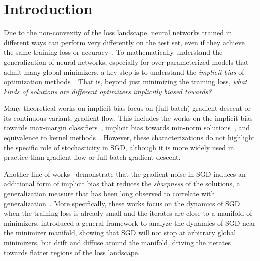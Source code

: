 \section{Introduction}

Due to the non-convexity of the loss landscape, neural networks trained in different ways can perform very differently on the test set, even if they achieve the same training loss or accuracy~\citep{zhang2017understanding,keskar2017on,liu2022pretraininglossbetterdownstream,saunshi2024inductive}.
To mathematically understand the generalization of neural networks, especially for over-parameterized models that admit many global minimizers, a key step is to understand the {\it implicit bias} of optimization methods~\citep{neyshabur2014search, soudry2018implicit}.
That is, beyond just minimizing the training loss, {\it what kinds of solutions are different optimizers implicitly biased towards?}

Many theoretical works on implicit bias focus on (full-batch) gradient descent or its continuous variant, gradient flow. This includes the works on the implicit bias towards max-margin classifiers~\citep{soudry2018implicit,nacson2019lexicographic,lyu2020gradient,ji2020directional}, implicit bias towards min-norm solutions~\citep{lyu2024dichotomy}, and equivalence to kernel methods~\citep{jacot2018neural,chizat2019lazy}.
However, these characterizations do not highlight the specific role of stochasticity in SGD, although it is more widely used in practice than gradient flow or full-batch gradient descent. 


Another line of works~\citep{blanc2020implicit,damian2021label,li2021happens} demonstrate that the gradient noise in SGD induces an additional form of implicit bias that reduces the {\it sharpness} of the solutions, a generalization measure that has been long observed to correlate with generalization~\citep{hochreiter1997flat,keskar2017on,jiang2020fantastic,foret2021sharpnessaware}.
More specifically, these works focus on the dynamics of SGD when the training loss is already small and the iterates are close to a manifold of minimizers. \citet{li2021happens} introduced a general framework to analyze the dynamics of SGD near the minimizer manifold, showing that SGD will not stop at arbitrary global minimizers, but drift and diffuse around the manifold, driving the iterates towards flatter regions of the loss landscape.






